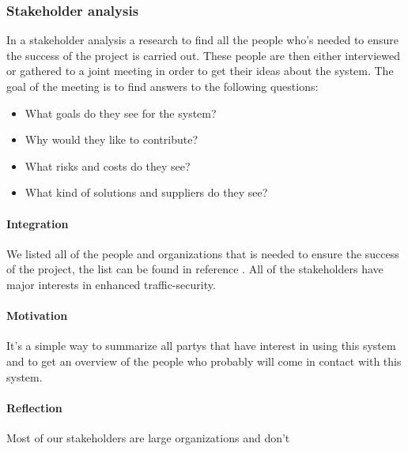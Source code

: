 \documentclass[10pt]{article}
\begin{document}
\subsubsection{Stakeholder analysis}
In a stakeholder analysis a research to find all the people who’s needed to ensure the success of the project is carried out. These people are then either interviewed or gathered to a joint meeting in order to get their ideas about the system. The goal of the meeting is to find answers to the following questions:
\begin{itemize}
\item What goals do they see for the system?
\item Why would they like to contribute?
\item What risks and costs do they see?
\item What kind of solutions and suppliers do they see?
\end{itemize}

\paragraph{Integration}
We listed all of the people and organizations that is needed to ensure the success of the project, the list can be found in reference \cite{pmv2}. All of the stakeholders have major interests in enhanced traffic-security.
\paragraph{Motivation}
It’s a simple way to summarize all partys that have interest in using this system and to get an overview of the people who probably will come in contact with this system.
\paragraph{Reflection}
Most of our stakeholders are large organizations and don’t
\end{document}
